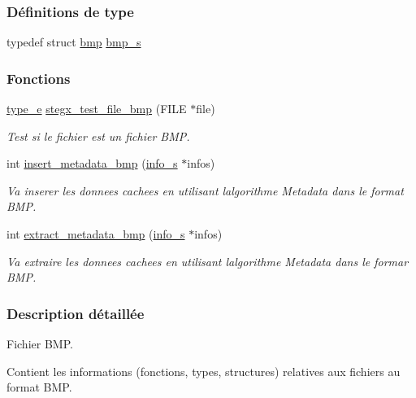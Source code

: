 \subsubsection*{Définitions de type}
\begin{DoxyCompactItemize}
\item 
typedef struct \hyperlink{a00162}{bmp} \hyperlink{a00077_afb8e06bb1e6eba33c97ae40d153a0a97}{bmp\+\_\+s}
\end{DoxyCompactItemize}
\subsubsection*{Fonctions}
\begin{DoxyCompactItemize}
\item 
\hyperlink{a00047_af1ca434cca36ba9fb2a45f6cef3a16d6}{type\+\_\+e} \hyperlink{a00077_a9981cb05f84d85245b570a20ece33548}{stegx\+\_\+test\+\_\+file\+\_\+bmp} (F\+I\+LE $\ast$file)
\begin{DoxyCompactList}\small\item\em Test si le fichier est un fichier B\+MP. \end{DoxyCompactList}\item 
int \hyperlink{a00077_a9b0bec96351bc1e6be9134900590d215}{insert\+\_\+metadata\+\_\+bmp} (\hyperlink{a00008_aa8ca908d92fb5bdd3c0a9e1f58b2cf03}{info\+\_\+s} $\ast$infos)
\begin{DoxyCompactList}\small\item\em Va inserer les donnees cachees en utilisant l\textquotesingle{}algorithme Metadata dans le format B\+MP. \end{DoxyCompactList}\item 
int \hyperlink{a00077_a14e9a0ddec04cc168cbfe21cd839166e}{extract\+\_\+metadata\+\_\+bmp} (\hyperlink{a00008_aa8ca908d92fb5bdd3c0a9e1f58b2cf03}{info\+\_\+s} $\ast$infos)
\begin{DoxyCompactList}\small\item\em Va extraire les donnees cachees en utilisant l\textquotesingle{}algorithme Metadata dans le formar B\+MP. \end{DoxyCompactList}\end{DoxyCompactItemize}


\subsubsection{Description détaillée}
Fichier B\+MP. 

Contient les informations (fonctions, types, structures) relatives aux fichiers au format B\+MP. 

